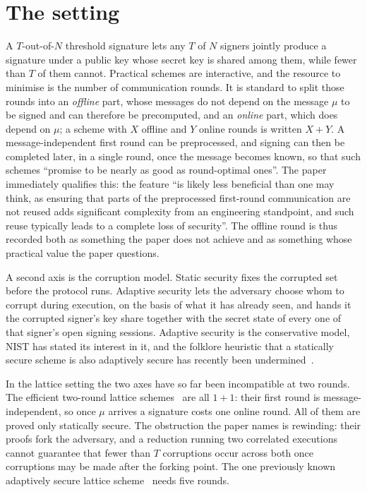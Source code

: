 \documentclass{aicr-conjecture}
\begin{document}
\section{The setting}\label{sec:setting}

A $T$-out-of-$N$ threshold signature lets any $T$ of $N$ signers
jointly produce a signature under a public key whose secret key is
shared among them, while fewer than $T$ of them cannot. Practical
schemes are interactive, and the resource to minimise is the number of
communication rounds. It is standard to split those rounds into an
\emph{offline} part, whose messages do not depend on the message $\mu$
to be signed and can therefore be precomputed, and an \emph{online}
part, which does depend on $\mu$; a scheme with $X$ offline and $Y$
online rounds is written $X+Y$. A message-independent first round can
be preprocessed, and signing can then be completed later, in a single
round, once the message becomes known, so that such schemes ``promise
to be nearly as good as round-optimal ones''. The paper immediately
qualifies this: the feature ``is likely less beneficial than one may
think, as ensuring that parts of the preprocessed first-round
communication are not reused adds significant complexity from an
engineering standpoint, and such reuse typically leads to a complete
loss of security''. The offline round is thus recorded both as
something the paper does not achieve and as something whose practical
value the paper questions.

A second axis is the corruption model. Static security fixes the
corrupted set before the protocol runs. Adaptive security lets the
adversary choose whom to corrupt during execution, on the basis of what
it has already seen, and hands it the corrupted signer's key share
together with the secret state of every one of that signer's open
signing sessions. Adaptive security is the conservative model, NIST has
stated its interest in it, and the folklore heuristic that a statically
secure scheme is also adaptively secure has recently been
undermined~\cite{CS25}.

In the lattice setting the two axes have so far been incompatible at
two rounds. The efficient two-round lattice
schemes~\cite{EKT24,CATZ24,ZT25,BKL25} are all $1+1$: their first round
is message-independent, so once $\mu$ arrives a signature costs one
online round. All of them are proved only statically secure. The
obstruction the paper names is rewinding: their proofs fork the
adversary, and a reduction running two correlated executions cannot
guarantee that fewer than $T$ corruptions occur across both once
corruptions may be made after the forking point. The one previously
known adaptively secure lattice scheme~\cite{KRT24} needs five rounds.
\end{document}
